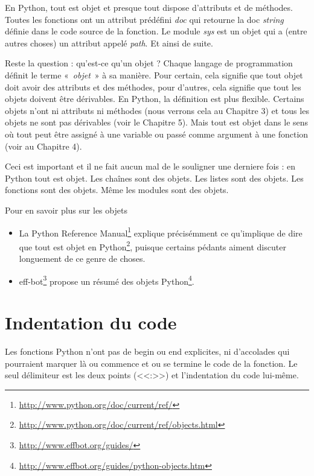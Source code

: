 En Python, tout est objet et presque tout dispose d'attributs et de méthodes. Toutes les fonctions ont un attribut prédéfini \emph{doc} qui retourne la doc \emph{string} définie dans le code source de la fonction. Le module \emph{sys} est un objet qui a (entre autres choses) un attribut appelé \emph{path}. Et ainsi de suite.

Reste la question : qu'est-ce qu'un objet ? Chaque langage de programmation définit le terme «~\emph{objet}~» à sa manière. Pour certain, cela signifie que tout objet doit avoir des attributs et des méthodes, pour d'autres, cela signifie que tout les objets doivent être dérivables. En Python, la définition est plus flexible. Certains objets n'ont ni attributs ni méthodes (nous verrons cela au Chapitre 3) et tous les objets ne sont pas dérivables (voir le Chapitre 5). Mais tout est objet dans le sens où tout peut être assigné à une variable ou passé comme argument à une fonction (voir au Chapitre 4).

\medskip
Ceci est important et il ne fait aucun mal de le souligner une derniere fois : en Python tout est objet. Les chaînes sont des objets. Les listes sont des objets. Les fonctions sont des objets. Même les modules sont des objets.

\medskip
\noindent Pour en savoir plus sur les objets

\medskip
\begin{itemize}
\item{La Python Reference Manual\footnote{\url{http://www.python.org/doc/current/ref/}} explique précisémment ce qu'implique de dire que tout est objet en Python\footnote{\url{http://www.python.org/doc/current/ref/objects.html}}, puisque certains pédants aiment discuter longuement de ce genre de choses.} 
\item{eff-bot\footnote{\url{http://www.effbot.org/guides/}} propose un résumé des objets Python\footnote{\url{http://www.effbot.org/guides/python-objects.htm}}.}
\end{itemize}

\section{Indentation du code}

Les fonctions Python n'ont pas de begin ou end explicites, ni d'accolades qui pourraient marquer là ou commence et ou se termine le code de la fonction. Le seul délimiteur est les deux points (<<:>>) et l'indentation du code lui-même.

